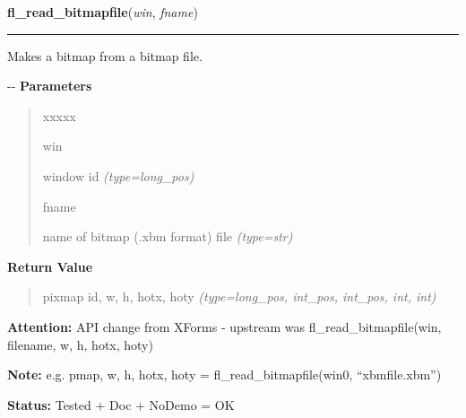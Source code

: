 \hspace{.8\funcindent}\begin{boxedminipage}{\funcwidth}

    \raggedright \textbf{fl\_read\_bitmapfile}(\textit{win}, \textit{fname})

    \vspace{-1.5ex}

    \rule{\textwidth}{0.5\fboxrule}
\setlength{\parskip}{2ex}

Makes a bitmap from a bitmap file.

-{}-
\setlength{\parskip}{1ex}
      \textbf{Parameters}
      \vspace{-1ex}

      \begin{quote}
        \begin{Ventry}{xxxxx}

          \item[win]


window id
            {\it (type=long\_pos)}

          \item[fname]


name of bitmap (.xbm format) file
            {\it (type=str)}

        \end{Ventry}

      \end{quote}

      \textbf{Return Value}
    \vspace{-1ex}

      \begin{quote}

pixmap id, w, h, hotx, hoty
      {\it (type=long\_pos, int\_pos, int\_pos, int, int)}

      \end{quote}

\textbf{Attention:} 
API change from XForms - upstream was
fl\_read\_bitmapfile(win, filename, w, h, hotx, hoty)


\textbf{Note:} 
e.g. pmap, w, h, hotx, hoty = fl\_read\_bitmapfile(win0,         ``xbmfile.xbm'')


\textbf{Status:} 
Tested + Doc + NoDemo = OK


    \end{boxedminipage}

    \label{xformslib:flbitmap:fl_create_from_bitmapdata}

